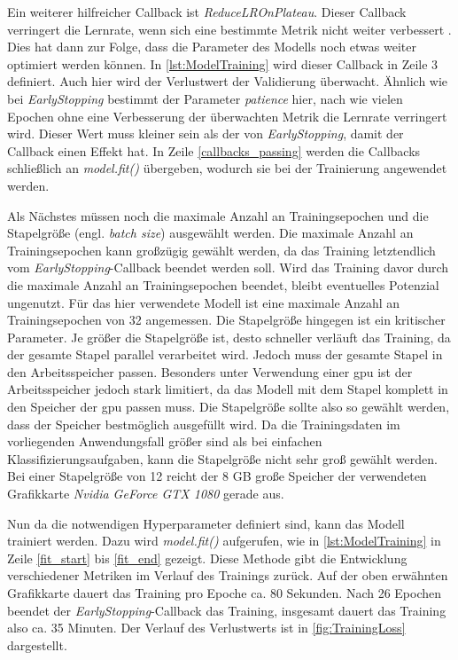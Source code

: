 Ein weiterer hilfreicher Callback ist \emph{ReduceLROnPlateau}.
Dieser Callback verringert die Lernrate, wenn sich eine bestimmte Metrik nicht weiter verbessert \cite{KerasReduceLROnPlateau}.
Dies hat dann zur Folge, dass die Parameter des Modells noch etwas weiter optimiert werden können.
In \autoref{lst:ModelTraining} wird dieser Callback in Zeile 3 definiert.
Auch hier wird der Verlustwert der Validierung überwacht.
Ähnlich wie bei \emph{EarlyStopping} bestimmt der Parameter \emph{patience} hier, nach wie vielen Epochen ohne eine Verbesserung der überwachten Metrik die Lernrate verringert wird.
Dieser Wert muss kleiner sein als der von \emph{EarlyStopping}, damit der Callback einen Effekt hat.
In Zeile \ref{callbacks_passing} werden die Callbacks schließlich an \emph{model.fit()} übergeben, wodurch sie bei der Trainierung angewendet werden.

Als Nächstes müssen noch die maximale Anzahl an Trainingsepochen und die Stapelgröße (engl. \emph{batch size}) ausgewählt werden.
Die maximale Anzahl an Trainingsepochen kann großzügig gewählt werden, da das Training letztendlich vom \emph{EarlyStopping}-Callback beendet werden soll.
Wird das Training davor durch die maximale Anzahl an Trainingsepochen beendet, bleibt eventuelles Potenzial ungenutzt.
Für das hier verwendete Modell ist eine maximale Anzahl an Trainingsepochen von 32 angemessen.
Die Stapelgröße hingegen ist ein kritischer Parameter.
Je größer die Stapelgröße ist, desto schneller verläuft das Training, da der gesamte Stapel parallel verarbeitet wird.
Jedoch muss der gesamte Stapel in den Arbeitsspeicher passen.
Besonders unter Verwendung einer \acrshort{gpu} ist der Arbeitsspeicher jedoch stark limitiert, da das Modell mit dem Stapel komplett in den Speicher der \acrshort{gpu} passen muss.
Die Stapelgröße sollte also so gewählt werden, dass der Speicher bestmöglich ausgefüllt wird.
Da die Trainingsdaten im vorliegenden Anwendungsfall größer sind als bei einfachen Klassifizierungsaufgaben, kann die Stapelgröße nicht sehr groß gewählt werden.
Bei einer Stapelgröße von 12 reicht der 8 GB große Speicher der verwendeten Grafikkarte \emph{Nvidia GeForce GTX 1080} gerade aus.

Nun da die notwendigen Hyperparameter definiert sind, kann das Modell trainiert werden.
Dazu wird \emph{model.fit()} aufgerufen, wie in \autoref{lst:ModelTraining} in Zeile \ref{fit_start} bis \ref{fit_end} gezeigt.
Diese Methode gibt die Entwicklung verschiedener Metriken im Verlauf des Trainings zurück.
Auf der oben erwähnten Grafikkarte dauert das Training pro Epoche ca. 80 Sekunden.
Nach 26 Epochen beendet der \emph{EarlyStopping}-Callback das Training, insgesamt dauert das Training also ca. 35 Minuten.
Der Verlauf des Verlustwerts ist in \autoref{fig:TrainingLoss} dargestellt.

